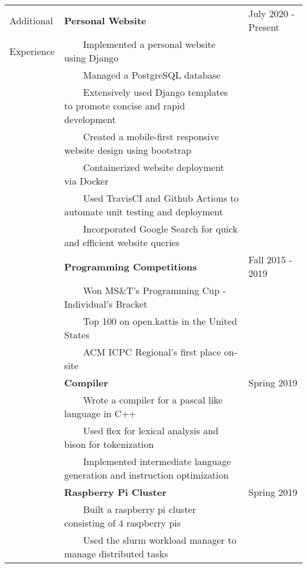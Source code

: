 \documentclass[10.5pt, arial]{article}
\newcommand{\tabitem}{~~\llap{\textbullet}~~}
\begin{document}
\begin{tabular}{p{1.5cm} p{13.2cm} l}
    Additional  & \textbf{Personal Website}                                     & July 2020 - Present \\
    Experience  & \tabitem Implemented a personal website using Django             & \\
                & \tabitem Managed a PostgreSQL database                        & \\
                & \tabitem Extensively used Django templates to promote concise and rapid development & \\ 
                & \tabitem Created a mobile-first responsive website design using bootstrap & \\
                & \tabitem Containerized website deployment via Docker          & \\
                & \tabitem Used TravisCI and Github Actions to automate unit testing and deployment & \\
                & \tabitem Incorporated Google Search for quick and efficient website queries & \\

                & \textbf{Programming Competitions}                             & Fall 2015 - 2019  \\
                & \tabitem Won MS\&T's Programming Cup - Individual's Bracket            &           \\
                & \tabitem Top 100 on open.kattis in the United States                   &           \\
                & \tabitem ACM ICPC Regional's first place on-site                       &           \\

                & \textbf{Compiler}                                             & Spring 2019 \\
                & \tabitem Wrote a compiler for a pascal like language in C++     & \\
                & \tabitem Used flex for lexical analysis and bison for tokenization                    & \\
                & \tabitem Implemented intermediate language generation and instruction optimization    & \\

                & \textbf{Raspberry Pi Cluster}                                 & Spring 2019 \\
                & \tabitem Built a raspberry pi cluster consisting of 4 raspberry pis & \\
                & \tabitem Used the slurm workload manager to manage distributed tasks & \\


\end{tabular}
\end{document}

